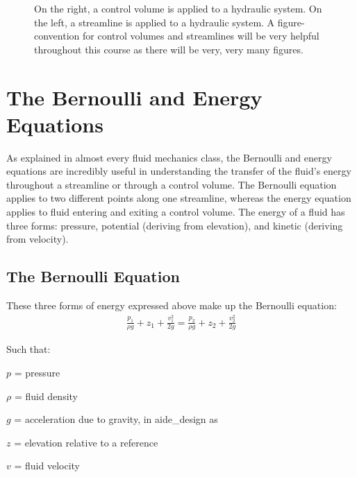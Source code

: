 \documentclass[letterpaper,10pt,english]{sphinxmanual}
\let\sphinxpxdimen\pdfpxdimen\else\newdimen\sphinxpxdimen
\begin{document}
\begin{figure}[htbp]
\centering
\capstart

\noindent\sphinxincludegraphics[width=650\sphinxpxdimen]{{image_control_volumes}.png}
\caption{On the right, a control volume is applied to a hydraulic system. On the left, a streamline is applied to a hydraulic system. A figure-convention for control volumes and streamlines will be very helpful throughout this course as there will be very, very many figures.}\label{\detokenize{Review/Review_Fluid_Mechanics:id4}}\label{\detokenize{Review/Review_Fluid_Mechanics:figure-image-control-volumes}}\end{figure}


\section{The Bernoulli and Energy Equations}
\label{\detokenize{Review/Review_Fluid_Mechanics:the-bernoulli-and-energy-equations}}\label{\detokenize{Review/Review_Fluid_Mechanics:heading-bernoulli-and-energy-equations}}
As explained in almost every fluid mechanics class, the Bernoulli and energy equations are incredibly useful in understanding the transfer of the fluid’s energy throughout a streamline or through a control volume. The Bernoulli equation applies to two different points along one streamline, whereas the energy equation applies to fluid entering and exiting a control volume. The energy of a fluid has three forms: pressure, potential (deriving from elevation), and kinetic (deriving from velocity).


\subsection{The Bernoulli Equation}
\label{\detokenize{Review/Review_Fluid_Mechanics:the-bernoulli-equation}}\label{\detokenize{Review/Review_Fluid_Mechanics:heading-bernoulli-equation}}
These three forms of energy expressed above make up the Bernoulli equation:
\begin{equation}\label{equation:Review/Review_Fluid_Mechanics:bernoulli_equation}
\begin{split}  \frac{p_1}{\rho g} + {z_1} + \frac{v_1^2}{2g} = \frac{p_2}{\rho g} + {z_2} + \frac{v_2^2}{2g}\end{split}
\end{equation}
\begin{DUlineblock}{0em}
\item[] Such that:
\item[] \(p\) = pressure
\item[] \(\rho\) = fluid density
\item[] \(g\) = acceleration due to gravity, in aide\_design as 
\item[] \(z\) = elevation relative to a reference
\item[] \(v\) = fluid velocity
\end{DUlineblock}
\end{document}
